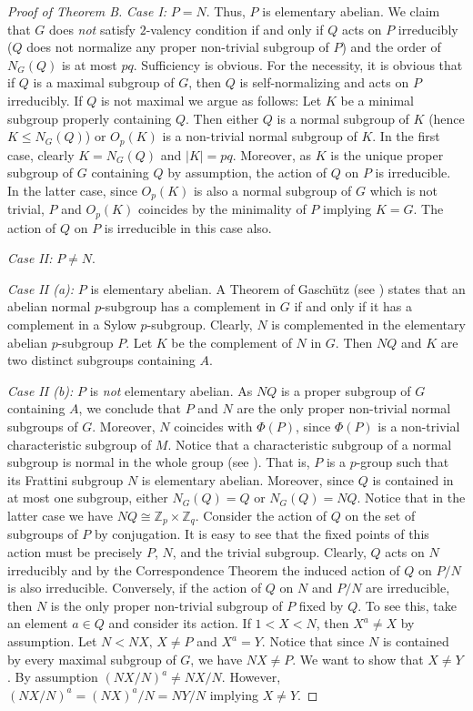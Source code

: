 \documentclass[a4paper,12pt]{article}
\theoremstyle{definition}
\theoremstyle{remark}
\theoremstyle{theorem}
\begin{document}
\begin{proof}[Proof of Theorem B]
  \emph{Case I:} $P=N$. Thus, $P$ is elementary abelian. We claim that
  $G$ does \emph{not} satisfy $2$-valency condition if and only if $Q$
  acts on $P$ irreducibly ($Q$ does not normalize any proper non-trivial subgroup of $P$) and the order of $N_G(Q)$ is at
  most $pq$. Sufficiency is obvious. For the necessity, it is obvious that if $Q$ is a maximal subgroup of $G$, then $Q$ is self-normalizing and acts on $P$ irreducibly. If $Q$ is not maximal we argue as follows: Let $K$ be a minimal subgroup properly containing $Q$. Then either
  $Q$ is a normal subgroup of $K$ (hence $K\leq N_G(Q)$) or
  $O_p(K)$ is a non-trivial normal subgroup of $K$. In the first case, clearly $K=N_G(Q)$ and $|K|=pq$. Moreover, as $K$ is the unique proper subgroup of $G$ containing $Q$ by assumption, the action of $Q$ on $P$ is irreducible. In the latter case, since $O_p(K)$ is also a normal subgroup of $G$ which is not trivial, $P$ and $O_p(K)$ coincides by the minimality of $P$ implying $K=G$. The action of $Q$ on $P$ is irreducible in this case also.

  \emph{Case II:} $P\neq N$.

  \emph{Case II (a):} $P$ is elementary abelian. A Theorem of Gaschütz
  (see \cite[Theorem 7.43]{Rotman1995}) states that an abelian normal
  $p$-subgroup has a complement in $G$ if and only if it has a
  complement in a Sylow $p$-subgroup. Clearly, $N$ is complemented in
  the elementary abelian $p$-subgroup $P$. Let $K$ be the complement
  of $N$ in $G$. Then $NQ$ and $K$ are two distinct subgroups
  containing $A$.

  \emph{Case II (b):} $P$ is \emph{not} elementary abelian. As $NQ$ is
  a proper subgroup of $G$ containing $A$, we conclude that $P$ and
  $N$ are the only proper non-trivial normal subgroups of
  $G$. Moreover, $N$ coincides with $\Phi(P)$, since $\Phi(P)$ is a
  non-trivial characteristic subgroup of $M$. Notice that a
  characteristic subgroup of a normal subgroup is normal in the whole
  group (see \cite[Lemma 5.20]{Rotman1995}). That is, $P$ is a
  $p$-group such that its Frattini subgroup $N$ is elementary
  abelian. Moreover, since $Q$ is contained in at most one subgroup,
  either $N_G(Q)=Q$ or $N_G(Q)=NQ$. Notice that in
  the latter case we have $NQ\cong \mathbb{Z}_p\times
  \mathbb{Z}_q$.
  Consider the action of $Q$ on the set of subgroups of $P$ by
  conjugation. It is easy to see that the fixed points of this action
  must be precisely $P$, $N$, and the trivial subgroup. Clearly, $Q$
  acts on $N$ irreducibly and by the Correspondence Theorem the
  induced action of $Q$ on $P/N$ is also irreducible. Conversely, if
  the action of $Q$ on $N$ and $P/N$ are irreducible, then $N$ is the
  only proper non-trivial subgroup of $P$ fixed by $Q$. To see this,
  take an element $a\in Q$ and consider its action. If $1<X<N$, then
  $X^a\neq X$ by assumption. Let $N<NX,\,X\neq P$ and $X^a=Y$. Notice that since $N$ is contained by every maximal subgroup of $G$, we have $NX\neq P$. We want to
  show that $X\neq Y$. By assumption $(NX/N)^a\neq NX/N$. However,
  $(NX/N)^a=(NX)^a/N=NY/N$ implying $X\neq Y$.
\end{proof}
\end{document}
